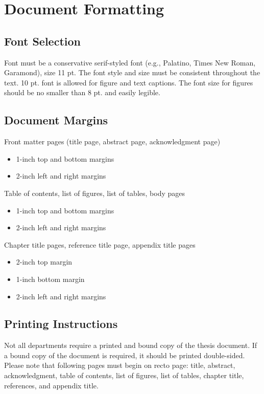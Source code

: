 \chapter{Document Formatting}
\label{ap:formatting}

\section{Font Selection}
	Font must be a conservative serif-styled font (e.g., Palatino, Times New Roman, Garamond), size 11 pt. The font style and size must be consistent throughout the text. 10 pt. font is allowed for figure and text captions. The font size for figures should be no smaller than 8 pt. and easily legible.

	\section{Document Margins}
	Front matter pages (title page, abstract page, acknowledgment page)
	\begin{itemize}
		\item 1-inch top and bottom margins
		\item 2-inch left and right margins
	\end{itemize}

	\noindent Table of contents, list of figures, list of tables, body pages
	\begin{itemize}
		\item 1-inch top and bottom margins
		\item 2-inch left and right margins
	\end{itemize}

	\noindent Chapter title pages, reference title page, appendix title pages
	\begin{itemize}
		\item 2-inch top margin
		\item 1-inch bottom margin
		\item 2-inch left and right margins
	\end{itemize}

	\section{Printing Instructions}
	Not all departments require a printed and bound copy of the thesis document. If a bound copy of the document is required, it should be printed double-sided. Please note that following pages must begin on recto page: title, abstract, acknowledgment, table of contents, list of figures, list of tables, chapter title, references, and appendix title.


